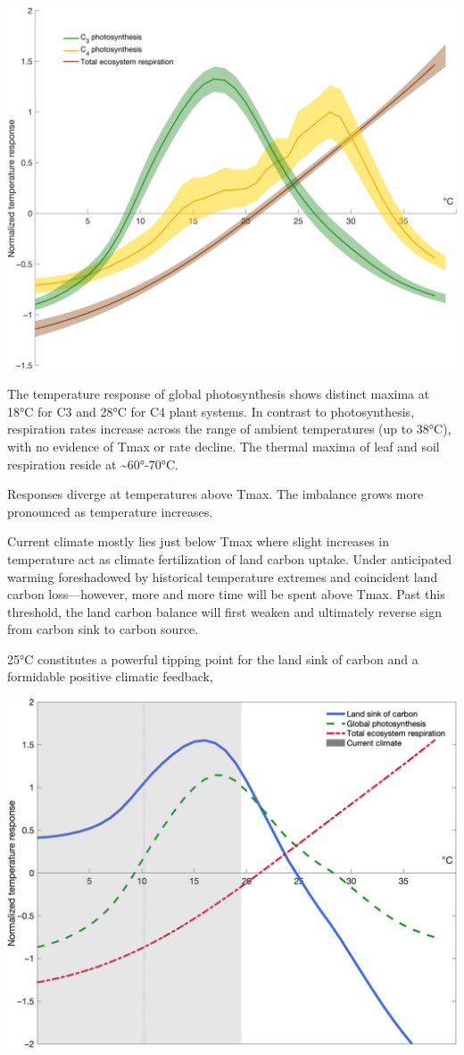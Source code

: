 \documentclass[
]{book}
\begin{document}
\includegraphics{fig/Photosythesis_Temp_Response.jpg}

The temperature response of global photosynthesis
shows distinct maxima at 18°C for C3 and 28°C for C4 plant systems.
In contrast to photosynthesis, respiration rates increase across
the range of ambient temperatures (up to 38°C),
with no evidence of Tmax or rate decline.
The thermal maxima of leaf and soil respiration reside at \textasciitilde60°-70°C.

Responses diverge at temperatures above Tmax.
The imbalance grows more pronounced as temperature increases.

Current climate mostly lies just below Tmax where slight increases in temperature act as
climate fertilization of land carbon uptake.
Under anticipated warming foreshadowed by historical temperature extremes and coincident
land carbon loss---however, more and more time will be spent above Tmax.
Past this threshold, the land carbon balance will first weaken and
ultimately reverse sign from carbon sink to carbon source.

25°C constitutes a powerful tipping point for the land
sink of carbon and a formidable positive climatic feedback,

\includegraphics{fig/Land_Sink_of_Carbon.jpg}
\end{document}
